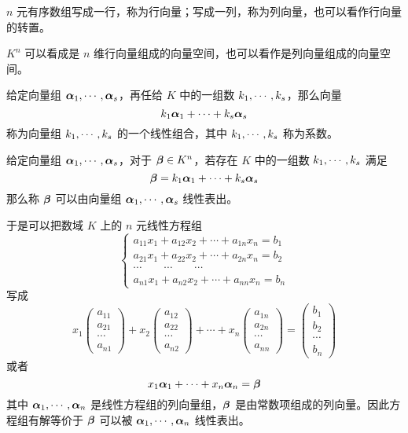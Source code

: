 $n$ 元有序数组写成一行，称为行向量；写成一列，称为列向量，也可以看作行向量的转置。

$K^n$ 可以看成是 $n$ 维行向量组成的向量空间，也可以看作是列向量组成的向量空间。

\begin{definition}[线性组合]
	给定向量组 $\boldsymbol{\alpha}_1,\cdots,\boldsymbol{\alpha}_s$，再任给 $K$ 中的一组数 $k_1,\cdots,k_s$，那么向量
	\[k_1 \boldsymbol{\alpha}_1+\cdots+k_s \boldsymbol{\alpha}_s\]
	称为向量组 $k_1,\cdots,k_s$ 的一个线性组合，其中 $k_1,\cdots,k_s$ 称为系数。
\end{definition}

\begin{definition}[线性表出]
	给定向量组 $\boldsymbol{\alpha}_1,\cdots,\boldsymbol{\alpha}_s$，对于 $\boldsymbol{\beta} \in K^n$，若存在 $K$ 中的一组数 $k_1,\cdots,k_s$ 满足
	\[\boldsymbol{\beta} = k_1\boldsymbol{\alpha}_1+\cdots+k_s\boldsymbol{\alpha}_s\]
	那么称 $\boldsymbol{\beta}$ 可以由向量组 $\boldsymbol{\alpha}_1,\cdots,\boldsymbol{\alpha}_s$ 线性表出。
\end{definition}

于是可以把数域 $K$ 上的 $n$ 元线性方程组
\[
	\left\{
	\begin{matrix}
		a_{11}x_1+a_{12}x_2+\cdots+a_{1n}x_n=b_1 \\
		a_{21}x_1+a_{22}x_2+\cdots+a_{2n}x_n=b_2 \\
		\cdots \qquad \cdots \qquad \cdots       \\
		a_{n1}x_1+a_{n2}x_2+\cdots +a_{nn}x_n=b_n
	\end{matrix}
	\right.
\]
写成
\[x_1\left(\begin{matrix}
			a_{11} \\ a_{21} \\ \cdots \\ a_{n1}
		\end{matrix}\right)+x_2\left(\begin{matrix}
			a_{12} \\ a_{22} \\ \cdots \\ a_{n2}
		\end{matrix}\right)+\cdots+x_n\left(\begin{matrix}
			a_{1n} \\ a_{2n} \\ \cdots \\ a_{nn}
		\end{matrix}\right)=\left(\begin{matrix}
			b_{1} \\ b_{2} \\ \cdots \\ b_{n}
		\end{matrix}\right)\]
或者
\[ x_1\boldsymbol{\alpha}_1+\cdots+x_n\boldsymbol{\alpha}_n=\boldsymbol{\beta} \]
其中 $\boldsymbol{\alpha}_1,\cdots,\boldsymbol{\alpha}_n$ 是线性方程组的列向量组，$\boldsymbol{\beta}$ 是由常数项组成的列向量。因此方程组有解等价于 $\boldsymbol{\beta}$ 可以被 $\boldsymbol{\alpha}_1,\cdots,\boldsymbol{\alpha}_n$ 线性表出。

